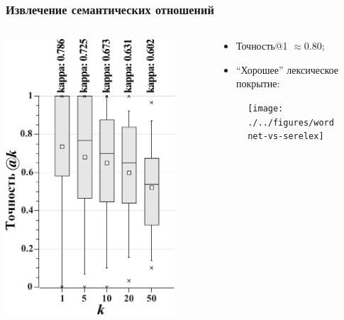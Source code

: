 \begin{frame}
\frametitle{Извлечение семантических отношений}
  \begin{columns}[T]
    \begin{column}{.4\textwidth}
     
\includegraphics[width=0.85\textwidth]{./kappa}
    
    \end{column}
    \begin{column}{.6\textwidth}
\begin{itemize}
  \item Точность@1 $\approx 0.80$;
  \item ``Хорошее'' лексическое покрытие:
  
\end{itemize}

\begin{figure}
\texttt{[image: ./../figures/wordnet-vs-serelex]}
\end{figure}
      
    \end{column}
  \end{columns}
\end{frame}






